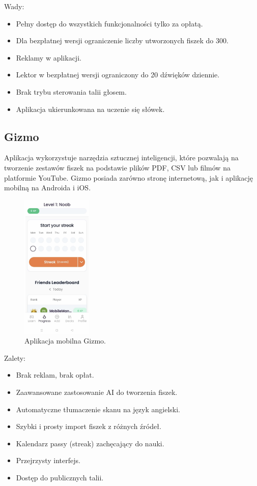 Wady:
\begin{itemize}
    \item Pełny dostęp do wszystkich funkcjonalności tylko za opłatą.
    \item Dla bezpłatnej wersji ograniczenie liczby utworzonych fiszek do 300.
    \item Reklamy w aplikacji.
    \item Lektor w bezpłatnej wersji ograniczony do 20 dźwięków dziennie.
    \item Brak trybu sterowania talii głosem.
    \item Aplikacja ukierunkowana na uczenie się słówek.
\end{itemize}

\subsection{Gizmo}

Aplikacja wykorzystuje narzędzia sztucznej inteligencji, które pozwalają na tworzenie zestawów fiszek na podstawie plików PDF, CSV lub filmów na platformie YouTube. Gizmo posiada zarówno stronę internetową, jak i aplikację mobilną na Androida i iOS.

\begin{figure}[H]
    \centering
    \includegraphics[width=0.3\textwidth]{chapters/chapter_3/gizmo}
    \caption{Aplikacja mobilna Gizmo.}
    \label{img:gizmo}
\end{figure}

Zalety:
\begin{itemize}
    \item Brak reklam, brak opłat.
    \item Zaawansowane zastosowanie AI do tworzenia fiszek.
    \item Automatyczne tłumaczenie skanu na język angielski.
    \item Szybki i prosty import fiszek z różnych źródeł.
    \item Kalendarz passy (streak) zachęcający do nauki.
    \item Przejrzysty interfejs.
    \item Dostęp do publicznych talii.
\end{itemize}

